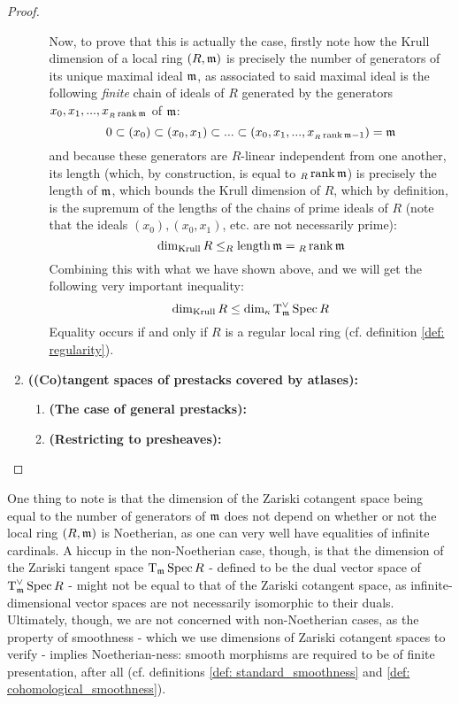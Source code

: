\begin{proof}
\begin{enumerate}
\begin{enumerate}
                                Now, to prove that this is actually the case, firstly note how the Krull dimension of a local ring $(R, \mathfrak{m})$ is precisely the number of generators of its unique maximal ideal $\mathfrak{m}$, as associated to said maximal ideal is the following \textit{finite} chain of ideals of $R$ generated by the generators $x_0, x_1, ..., x_{{}_R\operatorname{rank} \mathfrak{m}}$ of $\mathfrak{m}$:
                                    $$0 \subset (x_0) \subset (x_0, x_1) \subset ... \subset (x_0, x_1, ..., x_{{}_R\operatorname{rank} \mathfrak{m} - 1}) = \mathfrak{m}$$
                                and because these generators are $R$-linear independent from one another, its length (which, by construction, is equal to ${}_R\operatorname{rank} \mathfrak{m}$) is precisely the length of $\mathfrak{m}$, which bounds the Krull dimension of $R$, which by definition, is the supremum of the lengths of the chains of prime ideals of $R$ (note that the ideals $(x_0), (x_0, x_1)$, etc. are not necessarily prime):
                                    $$\dim_{\mathrm{Krull}} R \leq _R\operatorname{length} \mathfrak{m} = {}_R\operatorname{rank} \mathfrak{m}$$
                                Combining this with what we have shown above, and we will get the following very important inequality:
                                    $$\dim_{\mathrm{Krull}} R \leq \dim_{\kappa} \operatorname{T}^{\vee}_{\mathfrak{m}} \operatorname{Spec} R$$
                                Equality occurs if and only if $R$ is a regular local ring (cf. definition \ref{def: regularity}).
                            \end{enumerate}
                        \item \textbf{\textbf{((Co)tangent spaces of prestacks covered by atlases):}} 
                            \begin{enumerate}
                                \item \textbf{(The case of general prestacks):}
                                \item \textbf{(Restricting to presheaves):}
                            \end{enumerate}
                    \end{enumerate}
                \end{proof}
            \begin{remark}
                One thing to note is that the dimension of the Zariski cotangent space being equal to the number of generators of $\mathfrak{m}$ does not depend on whether or not the local ring $(R, \mathfrak{m})$ is Noetherian, as one can very well have equalities of infinite cardinals. A hiccup in the non-Noetherian case, though, is that the dimension of the Zariski tangent space $\operatorname{T}_{\mathfrak{m}}\operatorname{Spec} R$ - defined to be the dual vector space of $\operatorname{T}^{\vee}_{\mathfrak{m}}\operatorname{Spec} R$ - might not be equal to that of the Zariski cotangent space, as infinite-dimensional vector spaces are not necessarily isomorphic to their duals. Ultimately, though, we are not concerned with non-Noetherian cases, as the property of smoothness - which we use dimensions of Zariski cotangent spaces to verify - implies Noetherian-ness: smooth morphisms are required to be of finite presentation, after all (cf. definitions \ref{def: standard_smoothness} and \ref{def: cohomological_smoothness}).
            \end{remark}
                
